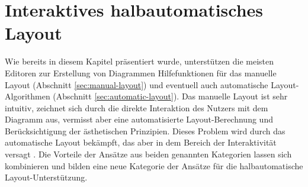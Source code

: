 












\section{Interaktives halbautomatisches Layout}
\label{sec:interactive-semi-automatic-layout}

Wie bereits in diesem Kapitel präsentiert wurde, unterstützen die meisten Editoren zur Erstellung von Diagrammen Hilfefunktionen für das manuelle Layout (Abschnitt \ref{sec:manual-layout}) und eventuell auch automatische Layout-Algorithmen (Abschnitt \ref{sec:automatic-layout}). Das manuelle Layout ist sehr intuitiv, zeichnet sich durch die direkte Interaktion des Nutzers mit dem Diagramm aus, vermisst aber eine automatisierte Layout-Berechnung und Berücksichtigung der ästhetischen Prinzipien. Dieses Problem wird durch das automatische Layout bekämpft, das aber in dem Bereich der Interaktivität versagt \cite{GladischSchumann14Semi-Automatic}. Die Vorteile der Ansätze aus beiden genannten Kategorien lassen sich kombinieren und bilden eine neue Kategorie der Ansätze für die halbautomatische Layout-Unterstützung.

